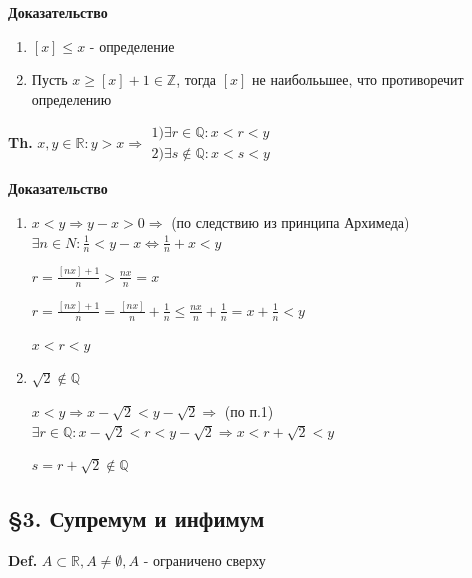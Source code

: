 \documentclass[14pt, letter paper]{article}
\begin{document}
\begin{center}
    \textbf{Доказательство}
\end{center}

\begin{enumerate}
    \item $[x] \leq x$ - определение
    \item Пусть $x \geq [x] + 1 \in \mathds{Z}$, тогда $[x]$ не наиболььшее, что противоречит определению
\end{enumerate}

\textbf{Th.} $x, y \in \mathds{R}: y > x \Rightarrow \begin{gathered}
    1) \exists r \in \mathds{Q}: x < r < y \\
    2) \exists s \notin \mathds{Q}: x < s < y
\end{gathered}$

\begin{center}
    \textbf{Доказательство}
\end{center}

\begin{enumerate}
    \item $x < y \Rightarrow y - x > 0 \Rightarrow$ (по следствию из принципа Архимеда) $\exists n \in N: \frac{1}{n} < y - x \Leftrightarrow \frac{1}{n} + x < y$

    $r = \frac{[nx]+1}{n} > \frac{nx}{n} = x$

    $r = \frac{[nx]+1}{n} = \frac{[nx]}{n} + \frac{1}{n} \leq \frac{nx}{n} + \frac{1}{n} = x + \frac{1}{n} < y$

    $x < r < y$

    \item $\sqrt{2} \notin \mathds{Q}$

    $x < y \Rightarrow x - \sqrt{2} < y - \sqrt{2} \Rightarrow$ (по п.1) $\exists r \in \mathds{Q}: x - \sqrt{2} < r < y - \sqrt{2} \Rightarrow x < r + \sqrt{2} < y$

    $s = r + \sqrt{2} \notin \mathds{Q}$
\end{enumerate}

\begin{center}
    \subsection*{\S 3. Супремум и инфимум}
\end{center}

\textbf{Def.} $A \subset \mathds{R}, A \neq \emptyset, A$ - ограничено сверху
\end{document}

